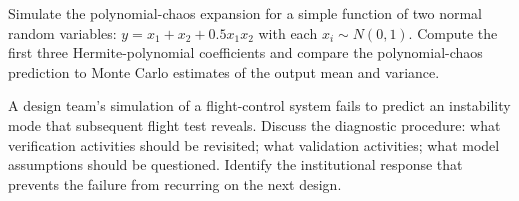 \begin{exercise}
Simulate the polynomial-chaos expansion for a simple function of two normal random variables: $y = x_1 + x_2 + 0.5 x_1 x_2$ with each $x_i \sim N(0,1)$. Compute the first three Hermite-polynomial coefficients and compare the polynomial-chaos prediction to Monte Carlo estimates of the output mean and variance.
\end{exercise}

\begin{exercise}
A design team's simulation of a flight-control system fails to predict an instability mode that subsequent flight test reveals. Discuss the diagnostic procedure: what verification activities should be revisited; what validation activities; what model assumptions should be questioned. Identify the institutional response that prevents the failure from recurring on the next design.
\end{exercise}
